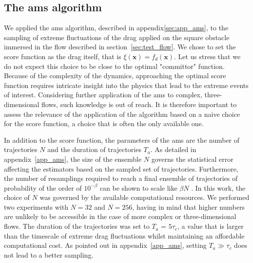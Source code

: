\documentclass{jfm}
\begin{document}
\subsection{The \acl{ams} algorithm}
\label{sec:ams}
We applied the \ac{ams} algorithm, described in appendix\ref{sec:app_ams}, to the sampling of extreme fluctuations of the drag applied on the square obstacle immersed in the flow described in section~\ref{sec:test_flow}.
We chose to set the score function as the drag itself, that is $\xi(\mathbf{x}) = f_d(\mathbf{x})$.
Let us stress that we do not expect this choice to be close to the optimal "committor" function.
Because of the complexity of the dynamics, approaching the optimal score function requires intricate insight
into the physics that lead to the extreme events of interest.
Considering further application of the \ac{ams} to complex, three-dimensional flows, such knowledge is out of reach.
It is therefore important to assess the relevance of the application of the algorithm based on a naive choice for the
score function, a choice that is often the only available one.

In addition to the score function, the parameters of the \ac{ams} are the number of trajectories $N$ and the duration of trajectories $T_a$.
As detailed in appendix~\ref{app_ams}, the size of the ensemble $N$ governs the statistical error affecting the estimators based on the sampled set of trajectories.
Furthermore, the number of resamplings required to reach a final ensemble of trajectories of probability of the order of $10^{-\beta}$ can be shown to scale like $\beta N$ \citep{lestang_computing_2018}.
In this work, the choice of $N$ was governed by the available computational resources.
We performed two experiments with $N = 32$ and $N = 256$, having in mind that higher numbers are unlikely to be accessible in the case of more complex or three-dimensional flows.
The duration of the trajectories was set to $T_a$ = $5\tau_c$, a value that is larger than the timescale of extreme drag fluctuations whilst maintaining an affordable computational cost.
As pointed out in appendix~\ref{app_ams}, setting $T_a \gg \tau_c$ does not lead to a better sampling.
\end{document}

